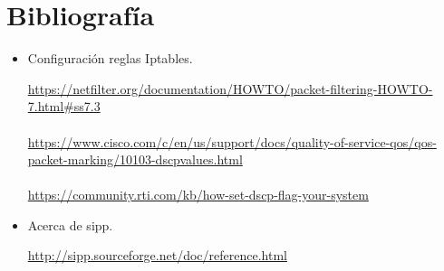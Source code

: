 \documentclass[11pt]{article}
\begin{document}
\section{Bibliografía}

\begin{itemize}
	\item Configuración reglas Iptables.

	\url{https://netfilter.org/documentation/HOWTO/packet-filtering-HOWTO-7.html#ss7.3}\\ \\
	\url{https://www.cisco.com/c/en/us/support/docs/quality-of-service-qos/qos-packet-marking/10103-dscpvalues.html}\\ \\
	\url{https://community.rti.com/kb/how-set-dscp-flag-your-system}
	
	\item Acerca de sipp.
	
	\url{http://sipp.sourceforge.net/doc/reference.html}
\end{itemize}
\end{document}
